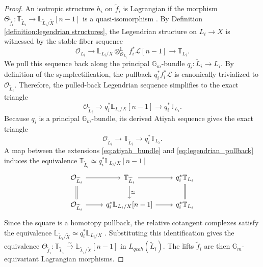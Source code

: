 \documentclass[reqno]{amsart}
\theoremstyle{definition}
\theoremstyle{remark}
\newcommand{\LL}{\mathbb{L}}
\newcommand{\TT}{\mathbb{T}}
\newcommand{\Gm}{\mathbb{G}_m}
\newcommand{\cO}{\mathcal{O}}
\newcommand{\cL}{\mathcal{L}}
\begin{document}
{\begin{proof}
  An isotropic structure $h_i$ on $\widetilde{f}_i$ is Lagrangian if the morphism $\Theta_{\widetilde{f}_i} \colon \TT_{\widetilde{L}_i} \to \LL_{\widetilde{L}_i/\widetilde{X}}[n-1]$ is a quasi-isomorphism \cite[Definition 2.8]{PTVV}. By Definition \ref{definition:legendrian structures}, the Legendrian structure on $L_i \to X$ is witnessed by the stable fiber sequence
  \begin{equation*}
    \cO_{L_i} \to \LL_{L_i/X} \otimes^{\mathbb{L}}_{\cO_{L_i}} f_i^*\cL[n-1] \to \TT_{L_i}.
  \end{equation*}
  We pull this sequence back along the principal $\Gm$-bundle $q_i \colon \widetilde{L}_i \to L_i$.
  By definition of the symplectification, the pullback $q_i^*f_i^*\cL$ is canonically trivialized to $\cO_{\widetilde{L}_i}$.
  Therefore, the pulled-back Legendrian sequence simplifies to the exact triangle
  \begin{equation} \label{eq:legendrian_pullback}
    \cO_{\widetilde{L}_i} \to q_i^*\LL_{L_i/X}[n-1] \to q_i^*\TT_{L_i}.
  \end{equation}
  Because $q_i$ is a principal $\Gm$-bundle, its derived Atiyah sequence gives the exact triangle
  \begin{equation} \label{eq:atiyah_bundle}
    \cO_{\widetilde{L}_i} \to \TT_{\widetilde{L}_i} \to q_i^*\TT_{L_i}.
  \end{equation}
  A map between the extensions \eqref{eq:atiyah_bundle} and \eqref{eq:legendrian_pullback} induces the equivalence $\TT_{\widetilde{L}_i} \simeq q_i^*\LL_{L_i/X}[n-1]$
  \[
    \begin{tikzcd}
      \cO_{\widetilde{L}_i} \arrow[r] \arrow[d, equal] &
      \TT_{\widetilde{L}_i} \arrow[r] \arrow[d, "\simeq"] &
      q_i^*\TT_{L_i} \arrow[d, equal] \\
      \cO_{\widetilde{L}_i} \arrow[r] & q_i^*\LL_{L_i/X}[n-1] \arrow[r]
      & q_i^*\TT_{L_i}
    \end{tikzcd}
  \]
  Since the square is a homotopy pullback, the relative cotangent complexes satisfy the equivalence $\LL_{\widetilde{L}_i/\widetilde{X}} \simeq q_i^* \LL_{L_i/X}$ \cite[Lemma 1.4.1.16(2)]{HAG-II}. Substituting this identification gives the equivalence $\Theta_{\widetilde{f}_i} \colon \TT_{\widetilde{L}_i} \xrightarrow{\sim} \LL_{\widetilde{L}_i/\widetilde{X}}[n-1]$ in $L_{qcoh}(\widetilde{L}_i)$. The lifts $\widetilde{f}_i$ are then $\Gm$-equivariant Lagrangian morphisms.
  


\end{proof}}
\end{document}
